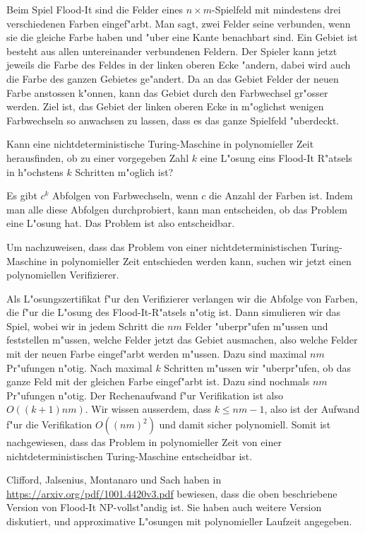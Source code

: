 Beim Spiel Flood-It sind die Felder eines $n\times m$-Spielfeld mit 
mindestens drei verschiedenen Farben eingef"arbt.
Man sagt, zwei Felder seine verbunden, wenn sie die gleiche Farbe
haben und "uber eine Kante benachbart sind.
Ein Gebiet ist besteht aus allen untereinander verbundenen Feldern.
Der Spieler kann jetzt jeweils die Farbe des Feldes in der linken
oberen Ecke "andern, dabei wird auch die Farbe des ganzen Gebietes 
ge"andert.
Da an das Gebiet Felder der neuen Farbe anstossen k"onnen, kann das
Gebiet durch den Farbwechsel gr"osser werden.
Ziel ist, das Gebiet der linken oberen Ecke in m"oglichst wenigen
Farbwechseln so anwachsen zu lassen, dass es das ganze Spielfeld "uberdeckt.

\begin{center}
\end{center}


Kann eine nichtdeterministische Turing-Maschine in polynomieller Zeit 
herausfinden, ob zu einer vorgegeben Zahl $k$ eine L"osung eins Flood-It
R"atsels in h"ochstens $k$ Schritten m"oglich ist?

\begin{loesung}
Es gibt $c^k$ Abfolgen von Farbwechseln, wenn $c$ die Anzahl der Farben ist.
Indem man alle diese Abfolgen durchprobiert, kann man entscheiden, ob
das Problem eine L"osung hat.
Das Problem ist also entscheidbar.

Um nachzuweisen, dass das Problem von einer nichtdeterministischen
Turing-Maschine in polynomieller Zeit entschieden werden kann,
suchen wir jetzt einen polynomiellen Verifizierer.

Als L"osungszertifikat f"ur den Verifizierer verlangen wir die Abfolge
von Farben, die f"ur die L"osung des Flood-It-R"atsels n"otig ist.
Dann simulieren wir das Spiel, wobei wir in jedem Schritt
die $nm$ Felder "uberpr"ufen m"ussen und feststellen m"ussen, welche
Felder jetzt das Gebiet ausmachen, also welche Felder mit der neuen
Farbe eingef"arbt werden m"ussen.
Dazu sind maximal $nm$ Pr"ufungen n"otig.
Nach maximal $k$ Schritten m"ussen wir "uberpr"ufen, ob das ganze Feld
mit der gleichen Farbe eingef"arbt ist.
Dazu sind nochmals $nm$ Pr"ufungen n"otig.
Der Rechenaufwand f"ur Verifikation ist also $O((k+1)nm)$.
Wir wissen ausserdem, dass $k\le nm-1$, also ist der Aufwand f"ur die
Verifikation $O((nm)^2)$ und damit sicher polynomiell.
Somit ist nachgewiesen, dass das Problem in polynomieller Zeit von
einer nichtdeterministischen Turing-Maschine entscheidbar ist.
\end{loesung}

\begin{diskussion}
Clifford, Jalsenius, Montanaro und Sach haben in
\url{https://arxiv.org/pdf/1001.4420v3.pdf} bewiesen, dass die oben
beschriebene Version von Flood-It NP-vollst"andig ist.
Sie haben auch weitere Version diskutiert, und approximative L"osungen
mit polynomieller Laufzeit angegeben.
\end{diskussion}

\begin{bewertung}
\end{bewertung}

